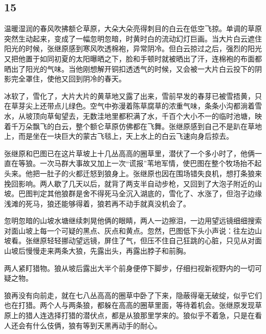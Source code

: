 \subsection*{15}


\par 温暖湿润的春风吹拂额仑草原，大朵大朵亮得刺目的白云在低空飞掠。单调的草原突然生动起来，变成了一幅忽明忽暗，时黄时白的流动幻灯巨画。当大片白云遮住阳光的时候，张继原感到寒风吹透棉袍，异常阴冷。但白云掠过之后，强烈的阳光又把他置于如同初夏的太阳曝晒之下，脸和手顿时就被晒出了汗，连棉袍的布面都晒出了阳光的气味。当他刚想解开铜扣透透气的时候，又会被一大片白云投下的阴影完全罩住，使他又回到阴冷的春天。
\par 冰软了，雪化了，大片大片的黄草地又露了出来，雪前早发的春芽已被雪捂黄，只在草芽尖上还带点儿绿色。空气中弥漫着陈草腐草的浓重气味，条条小沟都淌着雪水，从坡顶向草甸望去，无数洼地里都积满了水，千百个大小不一的临时池塘，映着千万朵飘飞的白云，整个额仑草原仿佛都在飞舞。张继原感到自己不是趴在草地上，而是坐在一块巨大的蒙古飞毯上，天上水上的白云飞速向身后掠去。
\par 张继原和巴图已在这片草坡上十几丛高高的圈草里，潜伏了一个多小时了，他俩一直在等狼。一次马群大事故又加上一次“谎报”苇地军情，使巴图在整个牧场抬不起头来。他把一肚子的火都迁怒到狼身上。张继原也因在围场错失良机，想打条狼来挽回影响。两人歇了几天以后，就背了两支半自动步枪，又回到了大泡子附近的山坡。巴图判定其他狼群是舍不得死马全沉入湖底的，雪化了、水涨了，但泡子边缘浅滩的死马，狼还能够得着，狼若再不动手就真没机会了。
\par 忽明忽暗的山坡水塘继续刺晃他俩的眼睛，两人一边擦泪，一边用望远镜细细搜索对面山坡上每一个可疑的黑点、灰点和黄点。忽然，巴图低下头小声说：往左边山坡看。张继原轻轻挪动望远镜，屏住了气，但压不住自己狂跳的心脏，只见从对面山坡后慢慢走来两条大狼，先露出头，再露出脖子和前胸。
\par 两人紧盯猎物。狼从坡后露出大半个前身便停下脚步，仔细扫视新视野内的一切可疑之物。
\par 狼再没有向前走，就在七八丛高高的圈草中卧了下来，隐蔽得毫无破绽，似乎它们也在打猎。两个人与两条狼，都躲在高高的圈草里面，等待着机会。张继原发现草原上的猎人连选择打猎的潜伏点，都是从狼那里学来的。狼似乎不着急，只是在看人还会有什么伎俩，狼有等到天黑再动手的耐心。
